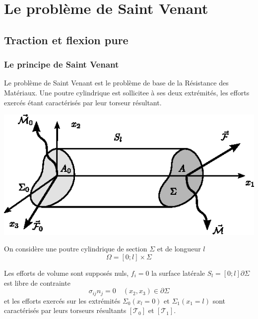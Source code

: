 \chapter{Le problème de Saint Venant} \label{chap:Ch07} 
\section{Traction et flexion pure} \label{sec:Ch07-1}
\subsection{Le principe de Saint Venant} \label{ssec:Ch07-1.1}
Le problème de Saint Venant est le problème de base de la Résistance des Matériaux.
Une poutre cylindrique est sollicitee à ses deux extrémités, les efforts exercés étant caractérisés par leur torseur résultant.
\begin{multicols}{2}
    \begin{center}
        \includegraphics{../images/T1_Ch07-01}
    \end{center}
    \columnbreak
    On considère une poutre cylindrique de section $\Sigma$ et de longueur $l$
    \begin{equation*}
        \Omega = \left[ 0;l \right] \times \Sigma
    \end{equation*}
\end{multicols}
Les efforts de volume sont supposés nuls, $f_i= 0$ la surface latérale  $S_l= \left[ 0;l \right]\partial \Sigma$ est libre de contrainte
\begin{equation}
    \sigma_{ij} n_j = 0 \quad \left( x_2, x_3 \right) \in \partial \Sigma
    \label{eq:Ch07-001}
\end{equation}
et les efforts exercés sur les extrémités $\Sigma_0 \left( x_l =0 \right)$ et $\Sigma_1 \left( x_1 =l \right)$ sont caractérisés par leurs torseurs résultants $\left[ \mathcal{T}_0 \right]$ et $\left[ \mathcal{T}_1 \right]$.
